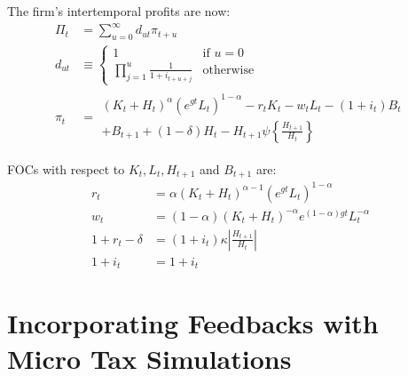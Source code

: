 \documentclass[letterpaper,12pt]{article}
\theoremstyle{definition}
\numberwithin{equation}{section}
\begin{document}
\begin{spacing}{1.5}
    The firm's intertemporal profits are now:
    \begin{align}
    \Pi_t & = \sum_{u=0}^\infty d_{ut}\pi_{t+u} \\
    d_{ut} & \equiv \left\{\begin{matrix} 1 & \text{if } u = 0 \\
                              \prod_{j=1}^u \tfrac{1}{1+i_{t+u+j}} & \text{otherwise} \end{matrix} \right. \\
    \pi_t & = \begin{matrix} (K_t+H_t)^\alpha(e^{gt}L_t)^{1-\alpha} - r_t K_t - w_t L_t - (1+i_t) B_t \\
                              + B_{t+1} + (1-\delta) H_t - H_{t+1}\psi\left\{\tfrac{H_{t+1}}{H_{t}} \right\} \end{matrix}
    \end{align}

    FOCs with respect to $K_t, L_t, H_{t+1}$ and $B_{t+1}$ are:
    \begin{align}
    r_t & = \alpha (K_t+H_t)^{\alpha-1}(e^{gt}L_t)^{1-\alpha} \\
    w_t & = (1-\alpha) (K_t+H_t)^{-\alpha}e^{(1-\alpha)gt}L_t^{-\alpha} \\
    1 + r_t - \delta & = (1+i_t)\kappa \left|\tfrac{H_{t+1}}{H_{t}}\right| \\
    1 + i_t & = 1 + i_t
    \end{align}


\section{Incorporating Feedbacks with Micro Tax Simulations}\label{SecMicro}


\end{spacing}
\end{document}

